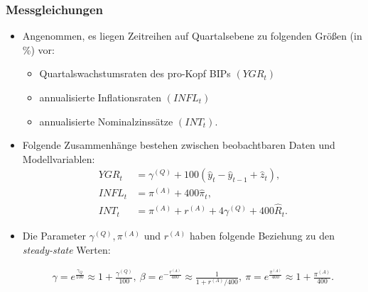 \documentclass[10pt]{beamer}  %
\begin{document}
\begin{frame}\frametitle{Messgleichungen}\label{Messgleichungen}
\begin{itemize}
\item Angenommen, es liegen Zeitreihen auf Quartalsebene zu folgenden Gr\"{o}{\ss}en (in \%) vor:
\begin{itemize}
\item Quartalswachstumsraten des pro-Kopf BIPs $(YGR_t)$
\item annualisierte Inflationsraten $(INFL_t)$
\item annualisierte Nominalzinss\"{a}tze $(INT_t)$.
\end{itemize}
\item Folgende Zusammenh\"{a}nge bestehen zwischen beobachtbaren Daten und Modellvariablen:
\begin{align*}
  YGR_t &= \gamma^{(Q)} + 100(\widehat{y}_t-\widehat{y}_{t-1}+\widehat{z}_t),\\
  INFL_t &= \pi^{(A)} + 400 \widehat{\pi}_t,\\
  INT_t &= \pi^{(A)} + r^{(A)} + 4 \gamma^{(Q)} + 400 \widehat{R}_t.
\end{align*}
\item Die Parameter $\gamma^{(Q)}, \pi^{(A)}$ und $r^{(A)}$ haben folgende Beziehung zu den \emph{steady-state} Werten:
\begin{scriptsize}\begin{align}\label{steadystateparam}
  \gamma = e^{\frac{\gamma_Q}{100}} \approx 1+\frac{\gamma^{(Q)}}{100}, ~ \beta=e^{-\frac{r^{(A)}}{400}} \approx \frac{1}{1+r^{(A)}/400}, ~ \pi = e^{\frac{\pi^{(A)}}{400}} \approx 1+\frac{\pi^{(A)}}{400}.
\end{align}\end{scriptsize}
\end{itemize}
\end{frame}
\end{document}
